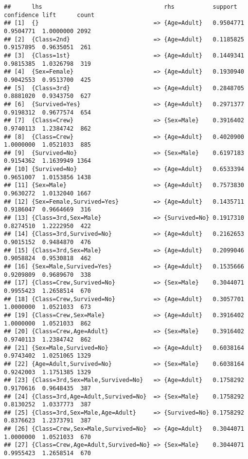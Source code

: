 \documentclass[]{article}
\begin{document}
\begin{verbatim}
##      lhs                                   rhs           support   confidence lift      count
## [1]  {}                                 => {Age=Adult}   0.9504771 0.9504771  1.0000000 2092 
## [2]  {Class=2nd}                        => {Age=Adult}   0.1185825 0.9157895  0.9635051  261 
## [3]  {Class=1st}                        => {Age=Adult}   0.1449341 0.9815385  1.0326798  319 
## [4]  {Sex=Female}                       => {Age=Adult}   0.1930940 0.9042553  0.9513700  425 
## [5]  {Class=3rd}                        => {Age=Adult}   0.2848705 0.8881020  0.9343750  627 
## [6]  {Survived=Yes}                     => {Age=Adult}   0.2971377 0.9198312  0.9677574  654 
## [7]  {Class=Crew}                       => {Sex=Male}    0.3916402 0.9740113  1.2384742  862 
## [8]  {Class=Crew}                       => {Age=Adult}   0.4020900 1.0000000  1.0521033  885 
## [9]  {Survived=No}                      => {Sex=Male}    0.6197183 0.9154362  1.1639949 1364 
## [10] {Survived=No}                      => {Age=Adult}   0.6533394 0.9651007  1.0153856 1438 
## [11] {Sex=Male}                         => {Age=Adult}   0.7573830 0.9630272  1.0132040 1667 
## [12] {Sex=Female,Survived=Yes}          => {Age=Adult}   0.1435711 0.9186047  0.9664669  316 
## [13] {Class=3rd,Sex=Male}               => {Survived=No} 0.1917310 0.8274510  1.2222950  422 
## [14] {Class=3rd,Survived=No}            => {Age=Adult}   0.2162653 0.9015152  0.9484870  476 
## [15] {Class=3rd,Sex=Male}               => {Age=Adult}   0.2099046 0.9058824  0.9530818  462 
## [16] {Sex=Male,Survived=Yes}            => {Age=Adult}   0.1535666 0.9209809  0.9689670  338 
## [17] {Class=Crew,Survived=No}           => {Sex=Male}    0.3044071 0.9955423  1.2658514  670 
## [18] {Class=Crew,Survived=No}           => {Age=Adult}   0.3057701 1.0000000  1.0521033  673 
## [19] {Class=Crew,Sex=Male}              => {Age=Adult}   0.3916402 1.0000000  1.0521033  862 
## [20] {Class=Crew,Age=Adult}             => {Sex=Male}    0.3916402 0.9740113  1.2384742  862 
## [21] {Sex=Male,Survived=No}             => {Age=Adult}   0.6038164 0.9743402  1.0251065 1329 
## [22] {Age=Adult,Survived=No}            => {Sex=Male}    0.6038164 0.9242003  1.1751385 1329 
## [23] {Class=3rd,Sex=Male,Survived=No}   => {Age=Adult}   0.1758292 0.9170616  0.9648435  387 
## [24] {Class=3rd,Age=Adult,Survived=No}  => {Sex=Male}    0.1758292 0.8130252  1.0337773  387 
## [25] {Class=3rd,Sex=Male,Age=Adult}     => {Survived=No} 0.1758292 0.8376623  1.2373791  387 
## [26] {Class=Crew,Sex=Male,Survived=No}  => {Age=Adult}   0.3044071 1.0000000  1.0521033  670 
## [27] {Class=Crew,Age=Adult,Survived=No} => {Sex=Male}    0.3044071 0.9955423  1.2658514  670
\end{verbatim}
\end{document}

